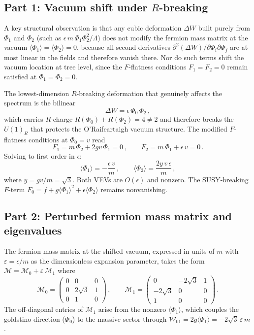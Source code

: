 \documentclass[12pt]{article}
\begin{document}
\subsection*{Part 1: Vacuum shift under $R$-breaking}

A key structural observation is that any cubic deformation $\Delta W$ built purely from $\Phi_1$ and $\Phi_2$ (such as $\epsilon\, m\, \Phi_1\Phi_2^2/\Lambda$) does not modify the fermion mass matrix at the vacuum $\langle\Phi_1\rangle = \langle\Phi_2\rangle = 0$, because all second derivatives $\partial^2(\Delta W)/\partial\Phi_i\partial\Phi_j$ are at most linear in the fields and therefore vanish there. Nor do such terms shift the vacuum location at tree level, since the $F$-flatness conditions $F_1 = F_2 = 0$ remain satisfied at $\Phi_1 = \Phi_2 = 0$.

The lowest-dimension $R$-breaking deformation that genuinely affects the spectrum is the bilinear
$$
\Delta W = \epsilon\, \Phi_0\,\Phi_2\,,
$$
which carries $R$-charge $R(\Phi_0) + R(\Phi_2) = 4 \neq 2$ and therefore breaks the $U(1)_R$ that protects the O'Raifeartaigh vacuum structure. The modified $F$-flatness conditions at $\Phi_0 = v$ read
$$
F_1 = m\,\Phi_2 + 2gv\,\Phi_1 = 0\,,\qquad F_2 = m\,\Phi_1 + \epsilon\, v = 0\,.
$$
Solving to first order in $\epsilon$:
$$
\langle\Phi_1\rangle = -\frac{\epsilon\, v}{m}\,,\qquad \langle\Phi_2\rangle = \frac{2y\,v\,\epsilon}{m}\,,
$$
where $y = gv/m = \sqrt{3}$. Both VEVs are $O(\epsilon)$ and nonzero. The SUSY-breaking $F$-term $F_0 = f + g\langle\Phi_1\rangle^2 + \epsilon\langle\Phi_2\rangle$ remains nonvanishing.

\subsection*{Part 2: Perturbed fermion mass matrix and eigenvalues}

The fermion mass matrix at the shifted vacuum, expressed in units of $m$ with $\varepsilon = \epsilon/m$ as the dimensionless expansion parameter, takes the form $\mathcal{M} = \mathcal{M}_0 + \varepsilon\,\mathcal{M}_1$ where
$$
\mathcal{M}_0 = \begin{pmatrix} 0 & 0 & 0 \\ 0 & 2\sqrt{3} & 1 \\ 0 & 1 & 0 \end{pmatrix}\,,\qquad
\mathcal{M}_1 = \begin{pmatrix} 0 & -2\sqrt{3} & 1 \\ -2\sqrt{3} & 0 & 0 \\ 1 & 0 & 0 \end{pmatrix}\,.
$$
The off-diagonal entries of $\mathcal{M}_1$ arise from the nonzero $\langle\Phi_1\rangle$, which couples the goldstino direction ($\Phi_0$) to the massive sector through $\mathcal{W}_{01} = 2g\langle\Phi_1\rangle = -2\sqrt{3}\,\varepsilon\,m$.
\end{document}
